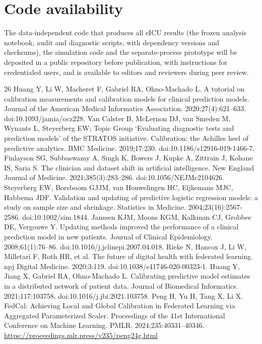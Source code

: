 \documentclass[11pt]{article}
\begin{document}
\section*{Code availability}
The data-independent code that produces all eICU results (the frozen analysis notebook, audit and diagnostic scripts, with dependency versions and checksums), the simulation code and the separate-process prototype will be deposited in a public repository before publication, with instructions for credentialed users, and is available to editors and reviewers during peer review.

\begin{thebibliography}{26}
 Huang Y, Li W, Macheret F, Gabriel RA, Ohno-Machado L. A tutorial on calibration measurements and calibration models for clinical prediction models. Journal of the American Medical Informatics Association. 2020;27(4):621--633. doi:10.1093/jamia/ocz228.
 Van Calster B, McLernon DJ, van Smeden M, Wynants L, Steyerberg EW; Topic Group `Evaluating diagnostic tests and prediction models' of the STRATOS initiative. Calibration: the Achilles heel of predictive analytics. BMC Medicine. 2019;17:230. doi:10.1186/s12916-019-1466-7.
 Finlayson SG, Subbaswamy A, Singh K, Bowers J, Kupke A, Zittrain J, Kohane IS, Saria S. The clinician and dataset shift in artificial intelligence. New England Journal of Medicine. 2021;385(3):283--286. doi:10.1056/NEJMc2104626.
 Steyerberg EW, Borsboom GJJM, van Houwelingen HC, Eijkemans MJC, Habbema JDF. Validation and updating of predictive logistic regression models: a study on sample size and shrinkage. Statistics in Medicine. 2004;23(16):2567-2586. doi:10.1002/sim.1844.
 Janssen KJM, Moons KGM, Kalkman CJ, Grobbee DE, Vergouwe Y. Updating methods improved the performance of a clinical prediction model in new patients. Journal of Clinical Epidemiology. 2008;61(1):76--86. doi:10.1016/j.jclinepi.2007.04.018.
 Rieke N, Hancox J, Li W, Milletar{\`i} F, Roth HR, et al. The future of digital health with federated learning. npj Digital Medicine. 2020;3:119. doi:10.1038/s41746-020-00323-1.
 Huang Y, Jiang X, Gabriel RA, Ohno-Machado L. Calibrating predictive model estimates in a distributed network of patient data. Journal of Biomedical Informatics. 2021;117:103758. doi:10.1016/j.jbi.2021.103758.
 Peng H, Yu H, Tang X, Li X. FedCal: Achieving Local and Global Calibration in Federated Learning via Aggregated Parameterized Scaler. Proceedings of the 41st International Conference on Machine Learning. PMLR. 2024;235:40331--40346. \url{https://proceedings.mlr.press/v235/peng24g.html}

\end{thebibliography}
\end{document}
